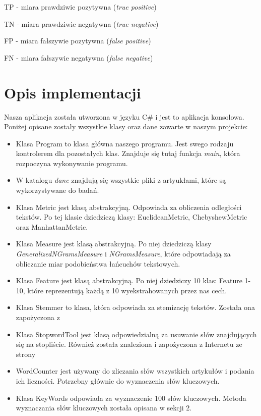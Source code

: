 \documentclass{classrep}
\begin{document}
TP - miara prawdziwie pozytywna (\textsl{true positive})

TN - miara prawdziwie negatywna (\textsl{true negative})

FP - miara fałszywie pozytywna (\textsl{false positive})

FN - miara fałszywie negatywna (\textsl{false negative})



\section{Opis implementacji} %
Nasza aplikacja została utworzona w języku C\# i jest to aplikacja konsolowa. Poniżej opisane zostały wszystkie klasy oraz dane zawarte w naszym projekcie:
\begin{itemize}
\item Klasa Program to klasa główna naszego programu. Jest swego rodzaju kontrolerem dla pozostałych klas. Znajduje się tutaj funkcja \textsl{main}, która rozpoczyna wykonywanie programu.
\item W katalogu \textsl{dane} znajdują się wszystkie pliki z artyukłami, które są wykorzystywane do badań.
\item Klasa Metric jest klasą abstrakcyjną. Odpowiada za obliczenia odległości tekstów. Po tej klasie dziedziczą klasy: EuclideanMetric, ChebyshewMetric oraz ManhattanMetric.
\item Klasa Measure jest klasą abstrakcyjną. Po niej dziedziczą klasy \textsl{GeneralizedNGramsMeasure} i \textsl{NGramsMeasure}, które odpowiadają za obliczanie miar podobieństwa łańcuchów tekstowych.
\item Klasa Feature jest klasą abstrakcyjną. Po niej dziedziczy 10 klas: Feature 1-10, które reprezentują każdą z 10 wyekstrahowanych przez nas cech.
\item Klasa Stemmer to klasa, która odpowiada za stemizację tekstów. Została ona zapożyczona z \cite{stemmer}
\item Klasa StopwordTool jest klasą odpowiedzialną za usuwanie słów znajdujących się na stopliście. Również została znaleziona i zapożyczona z Internetu ze strony \cite{stopword}
\item WordCounter jest używany do zliczania słów wszystkich artykułów i podania ich liczności. Potrzebny głównie do  wyznaczenia słów kluczowych.
\item Klasa KeyWords odpowiada za wyznaczenie 100 słów kluczowych. Metoda wyznaczania słów kluczowych została opisana w sekcji 2.

\end{itemize}
\end{document}
